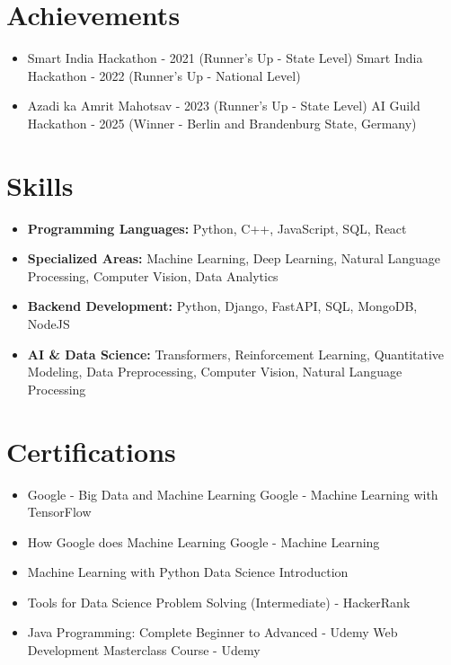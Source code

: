 \documentclass[a4paper,10pt]{article}
\begin{document}
\section*{Achievements}
\begin{itemize}
\item Smart India Hackathon - 2021 (Runner's Up - State Level) \hfill Smart India Hackathon - 2022 (Runner's Up - National Level)
\item Azadi ka Amrit Mahotsav - 2023 (Runner's Up - State Level) \hfill AI Guild Hackathon - 2025 (Winner - Berlin and Brandenburg State, Germany)
\end{itemize}

\section*{Skills}
\begin{itemize}
  \item \textbf{Programming Languages:} Python, C++, JavaScript, SQL, React
  \item \textbf{Specialized Areas:} Machine Learning, Deep Learning, Natural Language Processing, Computer Vision, Data Analytics
  \item \textbf{Backend Development:} Python, Django, FastAPI, SQL, MongoDB, NodeJS
  \item \textbf{AI \& Data Science:} Transformers, Reinforcement Learning, Quantitative Modeling, Data Preprocessing, Computer Vision, Natural Language Processing
\end{itemize}

\section*{Certifications}
\begin{itemize}
\item Google - Big Data and Machine Learning \hfill Google - Machine Learning with TensorFlow
\item How Google does Machine Learning \hfill Google - Machine Learning
\item Machine Learning with Python \hfill Data Science Introduction
\item Tools for Data Science \hfill Problem Solving (Intermediate) - HackerRank
\item Java Programming: Complete Beginner to Advanced - Udemy \hfill Web Development Masterclass Course - Udemy
\end{itemize}
\end{document}

